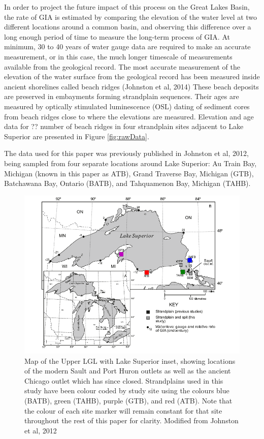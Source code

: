 \documentclass{article}
\begin{document}
 In order to project the future impact of this process on the Great Lakes Basin,
 the rate of GIA is estimated by comparing the elevation of the water level at
 two different locations around a common basin, and
 observing this difference over a long enough period of time to measure the long-term
 process of GIA. At minimum, 30 to 40 years of water gauge data are required to
 make an accurate measurement, or in this case, the much longer timescale of
 measurements available from the geological record.
 The most accurate measurement of the elevation of the water surface from the geological record
 has been measured inside ancient
 shorelines called beach ridges (Johnston et al, 2014)
 These beach deposits are preserved in embayments forming strandplain sequences.
 Their ages are measured by optically stimulated
 luminescence (OSL) dating of sediment cores from beach ridges close to where the
 elevations are measured. Elevation and age data for ?? number of beach ridges in
 four strandplain sites adjacent to Lake Superior are presented in Figure \ref{fig:rawData}.\\


\newpage 
 
 The data used for this paper was previously published in
 Johnston et al, 2012, being sampled from four separate locations around
  Lake Superior:
 Au Train Bay, Michigan (known in this paper as ATB), Grand Traverse Bay,
 Michigan (GTB), Batchawana Bay, Ontario (BATB), and 
 Tahquamenon Bay, Michigan (TAHB).\\
 \begin{figure}[h]
	\includegraphics[width=0.8\linewidth]{johnstonLaurentianMapWithSites.png}
	\caption{Map of the Upper LGL with Lake Superior inset, showing locations of the modern Sault and Port Huron
	outlets as well as the ancient Chicago outlet which has since closed. Strandplains used
	in this study have been colour coded by study site using the colours blue (BATB), green (TAHB), purple (GTB), and red (ATB). Note that
	 the colour of each site marker will remain constant for that site throughout the rest of
	 this paper for clarity. Modified from Johnston et al, 2012}
	\label{fig:johnstonLaurentianMapWithSites}
 \end{figure}
\end{document}

